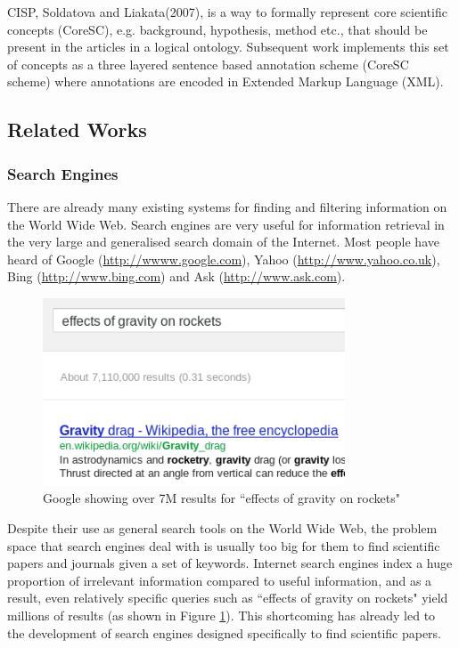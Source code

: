 \documentclass[12pt,a4paper]{article}
\begin{document}
CISP, Soldatova and Liakata(2007), is a way to formally represent core
scientific concepts (CoreSC), e.g. background, hypothesis, method etc., that
should be present in the articles in a logical
ontology\cite{soldatova2007ontology}. Subsequent work implements this set of
concepts as a three layered sentence based annotation scheme (CoreSC scheme)
where annotations are encoded in Extended Markup Language
(XML)\cite{LIAKATA10.644}.

\subsection{Related Works}
\label{sec:prior_art}

\subsubsection{Search Engines} 

There are already many existing systems for finding and filtering information
on the World Wide Web. Search engines are very useful for information retrieval
in the very large and generalised search domain of the Internet. Most people
have heard of Google (\url{http://wwww.google.com}), Yahoo
(\url{http://www.yahoo.co.uk}), Bing (\url{http://www.bing.com}) and Ask
(\url{http://www.ask.com}). 

\begin{figure}[!ht]
\includegraphics[width=0.80\textwidth]{images/space_rocket_query.png}
\caption{{Google showing over 7M results for ``effects of gravity on rockets"}}
\label{fig:rocket_results}
\end{figure}


Despite their use as general search tools on the World Wide Web, the problem
space that search engines deal with is usually too big for them to find
scientific papers and journals given a set of keywords. Internet search engines
index a huge proportion of irrelevant information compared to useful
information\cite{Berghel1997}, and as a result, even relatively specific
queries such as ``effects of gravity on rockets" yield millions of results (as
shown in Figure \ref{fig:rocket_results}). This shortcoming has already led to
the development of search engines designed specifically to find scientific
papers. 
\end{document}

